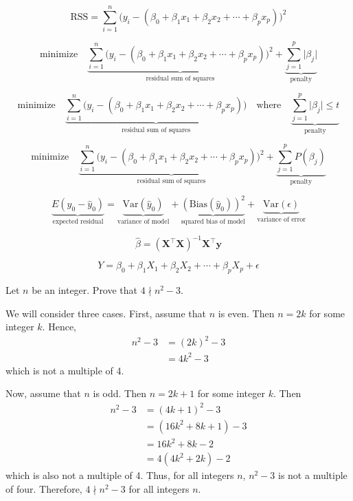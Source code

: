 \documentclass[12pt]{article}
\begin{document}
\[
	\text{RSS} = \sum\limits_{i = 1}^n \Big( y_i - (\beta_0 + \beta_1 x_1 + \beta_2 x_2 + \cdots + \beta_p x_p)\Big)^2
\]

\[
\text{minimize}\quad \underbrace{\sum\limits_{i = 1}^n \Big( y_i - (\beta_0 + \beta_1 x_1 + \beta_2 x_2 + \cdots + \beta_p x_p)\Big)^2}_{\text{residual sum of squares}} + \underbrace{\sum\limits_{j = 1}^p \vert \beta_j \vert}_{\text{penalty}}
\]

\[
	\text{minimize}\quad \underbrace{\sum\limits_{i = 1}^n \Big( y_i - (\beta_0 + \beta_1 x_1 + \beta_2 x_2 + \cdots + \beta_p x_p)\Big)}_{\text{residual sum of squares}}\quad \text{where}\quad  \underbrace{\sum\limits_{j = 1}^p \vert \beta_j\vert \leq t}_{\text{penalty}}
\]



\[
\text{minimize}\quad \underbrace{\sum\limits_{i = 1}^n \Big( y_i - (\beta_0 + \beta_1 x_1 + \beta_2 x_2 + \cdots + \beta_p x_p)\Big)^2}_{\text{residual sum of squares}} + \underbrace{\sum\limits_{j = 1}^p P(\beta_j)}_{\text{penalty}}
\]

\[
	\underbrace{E(y_0 - \hat{y}_0)}_{\text{expected residual}}=\underbrace{\text{Var}(\hat{y}_0)}_{\text{variance of model}} + \underbrace{(\text{Bias}(\hat{y}_0))^2}_{\text{squared bias of model}} + \underbrace{\text{Var}(\epsilon)}_{\text{variance of error}}
\]

\[
	\hat{\beta} = (\mathbf{X}^\top\mathbf{X})^{-1}\mathbf{X}^\top \mathbf{y}
\]

\[
	Y = \beta_0 + \beta_1 X_1 + \beta_2 X_2 + \cdots + \beta_p X_p + \epsilon
\]

\newpage

Let $n$ be an integer. Prove that $4\nmid n^2 - 3$.

We will consider three cases. First, assume that $n$ is even. Then $n = 2k$ for some integer $k$. Hence,
\begin{align}
	n^2 - 3 &= (2k)^2 - 3 \\
	&= 4k^2 - 3
\end{align}
which is not a multiple of 4.

Now, assume that $n$ is odd. Then $n = 2k + 1$ for some integer $k$. Then
\begin{align}
	n^2 - 3 &= (4k + 1)^2 - 3 \\
	&= (16k^2 + 8k + 1) - 3\\
	&= 16k^2 + 8k - 2\\
	&= 4(4k^2 + 2k) - 2
\end{align}
which is also not a multiple of 4. Thus, for all integers $n$, $n^2 - 3$ is not a multiple of four. Therefore, $4\nmid n^2 - 3$ for all integers $n$.
\end{document}
